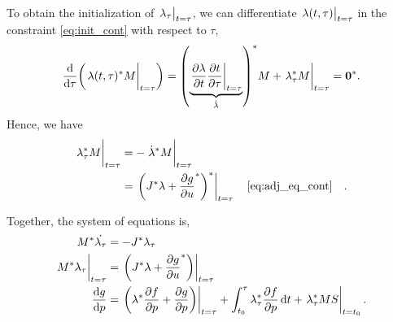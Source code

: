 \documentclass[a4paper,9pt]{article}
\theoremstyle{definition}
\theoremstyle{remark}
\begin{document}
To obtain the initialization of $\eval{\lambda_\tau}_{t=\tau}$, we can
differentiate $\eval{\lambda(t, \tau)}_{t=\tau}$ in the constraint
\cref{eq:init_cont} with respect to $\tau$,
\begin{equation}
  \dv{\tau}\qty(\eval{\lambda(t, \tau)^* M}_{t=\tau}) =
  \qty(\underbrace{
    \eval{\pdv{\lambda}{t}\pdv{t}{\tau}}_{t=\tau}}
  _{\dot{\lambda}})^*
  M + \eval{\lambda_\tau^* M}_{t=\tau} = \bm{0}^*.
\end{equation}
Hence, we have
\begin{align}
  \eval{\lambda_\tau^* M}_{t=\tau}
  &= -\eval{\dot{\lambda}^* M}_{t=\tau} \\
  &= \eval{\qty(J^* \lambda + \pdv{g}{u}^*)^*}_{t=\tau} \qq{\cref{eq:adj_eq_cont}}.
\end{align}

Together, the system of equations is,
\begin{align}
    M^*\dot{\lambda_\tau} &= -J^* \lambda_\tau \\
    \eval{M^* \lambda_\tau}_{t=\tau} &= \eval{\qty(J^* \lambda +
    \pdv{g}{u}^*)}_{t=\tau} \\
    \dv{g}{p} &= \eval{\qty(\lambda^* \pdv{f}{p} + \pdv{g}{p})}_{t=\tau} +
                          \int_{t_0}^\tau \lambda_\tau^* \pdv{f}{p} \dd{t} +
                          \eval{\lambda_\tau^* MS}_{t=t_0}.
\end{align}
\end{document}

